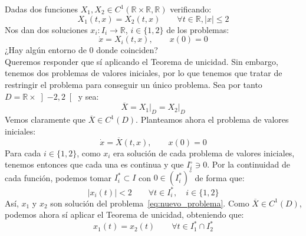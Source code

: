 \begin{ejercicio}
    Dadas dos funciones $X_1,X_2\in C^1(\mathbb{R}\times\mathbb{R},\mathbb{R})$ verificando:
    \begin{equation*}
        X_1(t,x) = X_2(t,x) \qquad \forall t\in \mathbb{R}, |x|\leq 2
    \end{equation*}
    Nos dan dos soluciones $x_i:I_i\to \mathbb{R}$, $i \in \{1,2\}$ de los problemas:
    \begin{equation*}
        \dot{x} = X_i(t,x), \qquad x(0) = 0
    \end{equation*}
    ¿Hay algún entorno de $0$ donde coinciden?\\

    \noindent
    Queremos responder que sí aplicando el Teorema de unicidad. Sin embargo, tenemos dos problemas de valores iniciales, por lo que tenemos que tratar de restringir el problema para conseguir un único problema. Sea por tanto $D=\mathbb{R}\times \left]-2,2\right[$ y sea:
    \begin{equation*}
        \overline{X} = X_1\big|_D = X_2\big|_D
    \end{equation*}
    Vemos claramente que $\overline{X}\in C^1(D)$. Planteamos ahora el problema de valores iniciales:
    \begin{equation}\label{eq:nuevo_problema}
        \dot{x} = \overline{X}(t,x), \qquad x(0) = 0
    \end{equation}
    Para cada $i \in \{1,2\}$, como $x_i$ era solución de cada problema de valores iniciales, tenemos entonces que cada una es continua y que $I_i^\circ \ni 0$. Por la continuidad de cada función, podemos tomar $I_i^\ast\subset I$ con $0\in (I_i^\ast)^\circ$ de forma que:
    \begin{equation*}
        |x_i(t)| < 2 \qquad \forall t\in I_i^\ast, \quad i \in \{1,2\}
    \end{equation*}
    Así, $x_1$ y $x_2$ son solución del problema~\eqref{eq:nuevo_problema}. Como $\overline{X}\in C^1(D)$, podemos ahora sí aplicar el Teorema de unicidad, obteniendo que:
    \begin{equation*}
        x_1(t) = x_2(t) \qquad \forall t\in I_1^\ast\cap I_2^\ast
    \end{equation*}
\end{ejercicio}

